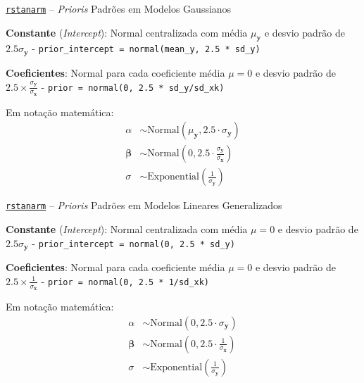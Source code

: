 \begin{frame}{\href{http://mc-stan.org/rstanarm/}{\texttt{rstanarm}} -- \textit{Prioris} Padrões em Modelos Gaussianos}
	\begin{vfilleditems}
		\item \textbf{Constante} (\textit{Intercept}): Normal centralizada com média $\mu_{\boldsymbol{y}}$ e desvio padrão de $2.5 \sigma_{\boldsymbol{y}}$ - \lstinline!prior_intercept = normal(mean_y, 2.5 * sd_y)!
		\item \textbf{Coeficientes}: Normal para cada coeficiente média $\mu = 0$ e desvio padrão de $2.5\times\frac{\sigma_{\boldsymbol{y}}}{\sigma_{\boldsymbol{x}}}$ - \lstinline!prior = normal(0, 2.5 * sd_y/sd_xk)!
	\end{vfilleditems}
	Em notação matemática:
	$$
		\begin{aligned}
			\alpha             & \sim \text{Normal}(\mu_{\boldsymbol{y}}, 2.5 \cdot \sigma_{\boldsymbol{y}})                           \\
			\boldsymbol{\beta} & \sim \text{Normal}\left( 0, 2.5 \cdot \frac{\sigma_{\boldsymbol{y}}}{\sigma_{\boldsymbol{x}}} \right) \\
			\sigma             & \sim \text{Exponential}\left( \frac{1}{\sigma_{\boldsymbol{y}}} \right)
		\end{aligned}
	$$
\end{frame}

\begin{frame}{\href{http://mc-stan.org/rstanarm/}{\texttt{rstanarm}} -- \textit{Prioris} Padrões em Modelos Lineares Generalizados}
	\begin{vfilleditems}
		\item \textbf{Constante} (\textit{Intercept}): Normal centralizada com média $\mu = 0$ e desvio padrão de $2.5 \sigma_{\boldsymbol{y}}$ - \lstinline!prior_intercept = normal(0, 2.5 * sd_y)!
		\item \textbf{Coeficientes}: Normal para cada coeficiente média $\mu = 0$ e desvio padrão de $2.5\times\frac{1}{\sigma_{\boldsymbol{x}}}$ - \lstinline!prior = normal(0, 2.5 * 1/sd_xk)!
	\end{vfilleditems}
	Em notação matemática:
	$$
		\begin{aligned}
			\alpha             & \sim \text{Normal}(0, 2.5 \cdot \sigma_{\boldsymbol{y}})                        \\
			\boldsymbol{\beta} & \sim \text{Normal}\left( 0, 2.5 \cdot \frac{1}{\sigma_{\boldsymbol{x}}} \right) \\
			\sigma             & \sim \text{Exponential}\left( \frac{1}{\sigma_{\boldsymbol{y}}} \right)
		\end{aligned}
	$$
\end{frame}

